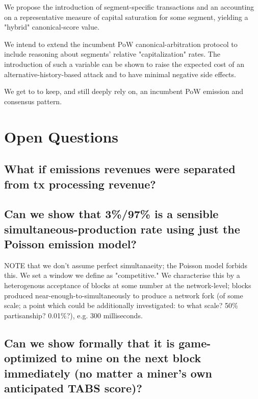 \documentclass[11pt]{article}
\theoremstyle{plain}
\begin{document}
We propose the introduction of segment-specific transactions and an accounting
on a representative measure of capital saturation for some segment, yielding a
"hybrid" canonical-score value.

We intend to extend the incumbent PoW canonical-arbitration protocol to include
reasoning about segments' relative "capitalization" rates.
The introduction of such a variable can be shown to raise the expected cost of
an alternative-history-based attack and to have minimal negative side effects.

We get to to keep, and still deeply rely on, an incumbent PoW emission and
consensus pattern.





\section{\normalsize{Open Questions}}

\subsection{\small{What if emissions revenues were separated from tx processing
revenue?}}\label{sec: S4.12}


\subsection{\small{Can we show that 3\%/97\% is a sensible
simultaneous-production rate using just the Poisson emission
model?}}\label{sec: S4.1}

NOTE that we don't assume perfect simultanaeity; the Poisson model forbids this.
We set a window we define as "competitive." We characterise this by a
heterogenous acceptance of blocks at some number at the network-level; blocks
produced near-enough-to-simultaneously to produce a network fork (of some
scale; a point which could be additionally investigated: to what scale? 50\%
partisanship? 0.01\%?), e.g. 300 milliseconds.

\subsection{\small{Can we show formally that it is game-optimized to mine on
the next block immediately (no matter a miner's own anticipated TABS
score)?}}\label{sec: S4.2}
\end{document}
